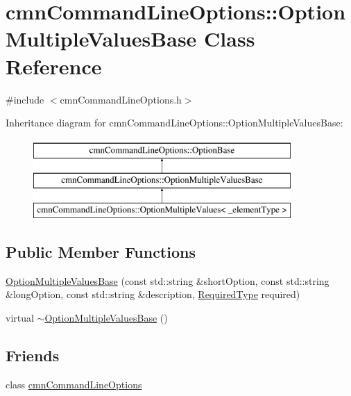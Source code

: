 \hypertarget{classcmn_command_line_options_1_1_option_multiple_values_base}{}\section{cmn\+Command\+Line\+Options\+:\+:Option\+Multiple\+Values\+Base Class Reference}
\label{classcmn_command_line_options_1_1_option_multiple_values_base}


{\ttfamily \#include $<$cmn\+Command\+Line\+Options.\+h$>$}

Inheritance diagram for cmn\+Command\+Line\+Options\+:\+:Option\+Multiple\+Values\+Base\+:\begin{figure}[H]
\begin{center}
\leavevmode
\includegraphics[height=3.000000cm]{d3/dd8/classcmn_command_line_options_1_1_option_multiple_values_base}
\end{center}
\end{figure}
\subsection*{Public Member Functions}
\begin{DoxyCompactItemize}
\item 
\hyperlink{classcmn_command_line_options_1_1_option_multiple_values_base_a54b498f115dfee799f9d3bd762182b15}{Option\+Multiple\+Values\+Base} (const std\+::string \&short\+Option, const std\+::string \&long\+Option, const std\+::string \&description, \hyperlink{group__cisst_common_gac239a3ca62dd4e3b391824f6f1a97c76}{Required\+Type} required)
\item 
virtual \hyperlink{classcmn_command_line_options_1_1_option_multiple_values_base_af00362fe6ac89a03d9ffb3ac3fce84c3}{$\sim$\+Option\+Multiple\+Values\+Base} ()
\end{DoxyCompactItemize}
\subsection*{Friends}
\begin{DoxyCompactItemize}
\item 
class \hyperlink{classcmn_command_line_options_1_1_option_multiple_values_base_a18923f23ed3914806f1edf878a64b422}{cmn\+Command\+Line\+Options}
\end{DoxyCompactItemize}
